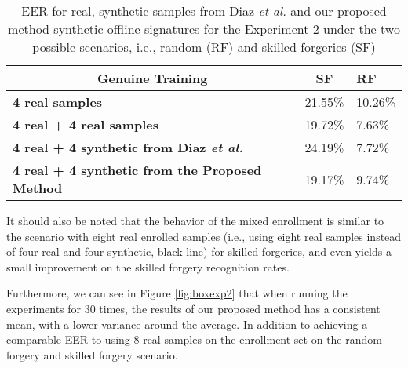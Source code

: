 \begin{table}[!htb]
    \renewcommand{\arraystretch}{1.3}
    \caption{EER for real, synthetic samples from Diaz \textit{et al.} \cite{diaz2014generation} and our proposed method synthetic offline signatures for the Experiment 2 under the two possible scenarios, i.e., random (RF) and skilled forgeries (SF)}
    \label{exp2_results_table}
    \centering
    \begin{tabular}{|l|l|l|}
        \hline
        \multicolumn{1}{|c|}{\textbf{Genuine Training}} & \multicolumn{1}{c|}{\textbf{SF}} & \textbf{RF} \\ \hline
        \textbf{4 real samples}                                         & 21.55\%                     & 10.26\%                         \\ \hline
        \textbf{4 real + 4 real samples}                       & 19.72\%                      & 7.63\%                        \\ \hline
        \textbf{4 real + 4 synthetic from Diaz \textit{et al.}}                           & 24.19\%                         & 7.72\%                \\ \hline
        \textbf{4 real + 4 synthetic from the Proposed Method}                           & 19.17\%         & 9.74\%                        \\ \hline
    \end{tabular}

\end{table}

It should also be noted that the behavior of the mixed enrollment is similar to the scenario with eight real enrolled samples (i.e., using eight real samples instead of
four real and four synthetic, black line) for skilled forgeries, and even yields a small improvement on the skilled forgery recognition rates. 

Furthermore, we can see in Figure \ref{fig:boxexp2} that when running the experiments for 30 times, the results of our proposed method has a consistent mean, with
a lower variance around the average. In addition to achieving a comparable EER to using 8 real samples on the enrollment set on the random forgery and skilled forgery scenario.

